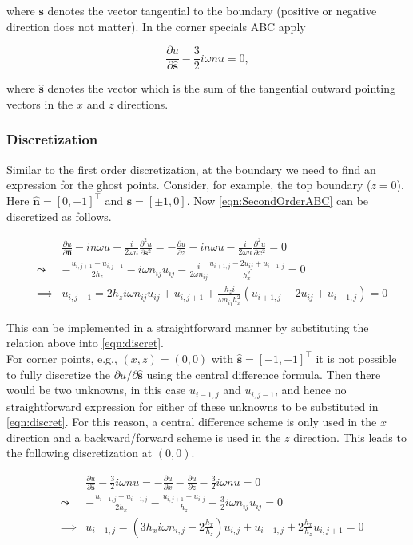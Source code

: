 \documentclass[10pt,a4paper]{article}
\newcommand{\n}{\mathbf{n}}
\newcommand{\s}{\mathbf{s}}
\begin{document}
{where $\s$ denotes the vector tangential to the boundary (positive or negative direction does not matter). In the corner specials ABC apply \cite{SecondOrderCorner}

\begin{equation}
\frac{\partial u}{\partial \hat{\s}}-\frac{3}{2}i\omega nu=0,
\end{equation}

where $\hat{\s}$ denotes the vector which is the sum of the tangential outward pointing vectors in the $x$ and $z$ directions.

\subsubsection{Discretization}
Similar to the first order discretization, at the boundary we need to find an expression for the ghost points. Consider, for example, the top boundary ($z=0$). Here $\hat{\n}=[0,-1]^\top$ and $\s=[\pm 1,0]$. Now \cref{eqn:SecondOrderABC} can be discretized as follows.

\begin{eqnarray}
&&\frac{\partial u}{\partial \hat{\n}} - in\omega u - \frac{i}{2\omega n}\frac{\partial^2 u}{\partial \s^2}= -\frac{\partial u}{\partial z} - in\omega u - \frac{i}{2\omega n}\frac{\partial^2 u}{\partial x^2}=0\\
&\leadsto& -\frac{u_{i,j+1}-u_{i,j-1}}{2h_z} - i\omega n_{ij}u_{ij}-\frac{i}{2\omega n_{ij}}\frac{u_{i+1,j}-2u_{ij}+u_{i-1,j}}{h_x^2}=0\\
&\implies& u_{i,j-1} = 2h_z i\omega n_{ij}u_{ij}+u_{i,j+1}+\frac{h_z i}{\omega n_{ij}h_x^2}(u_{i+1,j}-2u_{ij}+u_{i-1,j})=0
\end{eqnarray}

This can be implemented in a straightforward manner by substituting the relation above into \cref{eqn:discret}.\\

For corner points, e.g., $(x,z)=(0,0)$ with $\hat{\s}=[-1,-1]^\top$ it is not possible to fully discretize the $\partial u/\partial\hat{\s}$ using the central difference formula. Then there would be two unknowns, in this case $u_{i-1,j}$ and $u_{i,j-1}$, and hence no straightforward expression for either of these unknowns to be substituted in \cref{eqn:discret}. For this reason, a central difference scheme is only used in the $x$ direction and a backward/forward scheme is used in the $z$ direction. This leads to the following discretization at $(0,0)$.

\begin{eqnarray}
&& \frac{\partial u}{\partial \hat{\s}}-\frac{3}{2}i\omega nu= -\frac{\partial u}{\partial x}-\frac{\partial u}{\partial z}-\frac{3}{2}i\omega nu=0\\
&\leadsto& -\frac{u_{i+1,j}-u_{i-1,j}}{2h_x}-\frac{u_{i,j+1}-u_{i,j}}{h_z}-\frac{3}{2}i\omega n_{ij}u_{ij}=0\\
&\implies& u_{i-1,j} = (3h_xi\omega n_{i,j}-2\frac{h_x}{h_z})u_{i,j}+u_{i+1,j}+2\frac{h_x}{h_z}u_{i,j+1}=0
\end{eqnarray}

}
\end{document}
